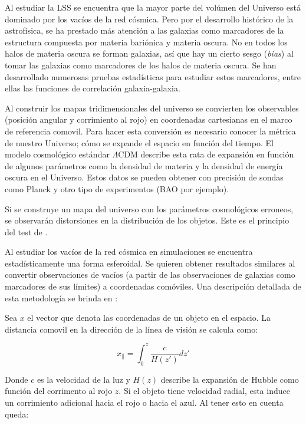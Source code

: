 \documentclass[preprint]{aastex62}
\begin{document}
  Al estudiar la LSS se encuentra que la mayor parte del volúmen del Universo está dominado
  por los vacíos de la red cósmica. Pero por el desarrollo histórico de la astrofísica, se ha
  prestado más atención a las galaxias como marcadores de la estructura compuesta por materia
  bariónica y materia oscura. No en todos los halos de materia oscura se forman galaxias, así
  que hay un cierto sesgo (\textit{bias}) al tomar las galaxias como marcadores de los
  halos de materia oscura. Se han desarrollado numerosas pruebas estadísticas para estudiar
  estos marcadores, entre ellas las funciones de correlación galaxia-galaxia.

  Al construir los mapas tridimensionales del universo se convierten los observables (posición
  angular y corrimiento al rojo) en coordenadas cartesianas en el marco de referencia comovil.
  Para hacer esta conversión es necesario conocer la métrica de nuestro Universo; cómo se
  expande el espacio en función del tiempo. El modelo cosmológico estándar $\Lambda$CDM
  describe esta rata de expansión en función de algunos parámetros como la densidad de materia
  y la densidad de energía oscura en el Universo. Estos datos se pueden obtener con precisión
  de sondas como Planck y otro tipo de experimentos (BAO por ejemplo).

  Si se construye un mapa del universo con los parámetros cosmológicos erroneos, se observarán
  distorsiones en la distribución de los objetos. Este es el principio del test de
  \citet{AlcockPaczynski1979}.

  Al estudiar los vacíos de la red cósmica en simulaciones se encuentra estadísticamente una
  forma esferoidal. Se quieren obtener resultados similares al convertir observaciones de
  vacíos (a partir de las observaciones de galaxias como marcadores de sus límites) a coordenadas
  comóviles. Una descripción detallada de esta metodología se brinda en \citet{Hamaus2015}:

  Sea $x$ el vector que denota las coordenadas de un objeto en el espacio. La distancia comovil en la
  dirección de la línea de visión se calcula como:

  \begin{equation}
    x_{\parallel} = \int _0 ^z \frac{c}{H(z')}dz'
  \end{equation}

  Donde $c$ es la velocidad de la luz y $H(z)$ describe la expansión de Hubble como función del
  corrimento al rojo $z$. Si el objeto tiene velocidad radial, esta induce un corrimiento adicional
  hacia el rojo o hacia el azul. Al tener esto en cuenta queda:
\end{document}

